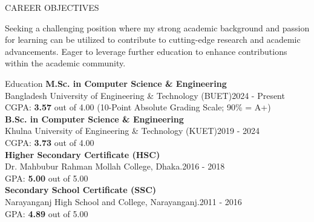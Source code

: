 \documentclass{resume} %
\begin{document}
\color{black}






\vspace{0.75 em}
\begin{rSection}{CAREER OBJECTIVES}
\vspace{-1.25em}
\item {Seeking a challenging position where my strong academic background and passion for learning can be utilized to contribute to cutting-edge research and academic advancements. Eager to leverage further education to enhance contributions within the academic community.}
\\
\end{rSection}



\begin{rSection}{Education}
{\bf M.Sc. in Computer Science \& Engineering }\\ Bangladesh University of Engineering \& Technology (BUET)\hfill {2024 - Present}\\
CGPA: {\bf 3.57} out of 4.00 (10-Point Absolute Grading Scale; 90\% = A+)\\
{\bf B.Sc. in Computer Science \& Engineering }\\ Khulna University of Engineering \& Technology (KUET)\hfill {2019 - 2024}\\
CGPA: {\bf 3.73} out of 4.00 \\
{\bf Higher Secondary Certificate (HSC)}\\
Dr. Mahbubur Rahman Mollah College, Dhaka.\hfill {2016 - 2018}\\
GPA: {\bf 5.00} out of 5.00\\
{\bf Secondary School Certificate (SSC)}\\
Narayanganj High School and College, Narayanganj.\hfill {2011 - 2016}\\
GPA: {\bf 4.89} out of 5.00

\end{rSection}
\end{document}
